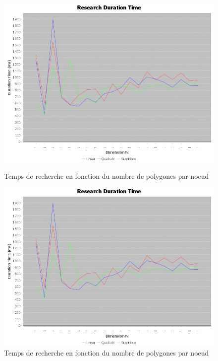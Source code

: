 \documentclass {article}
\begin{document}
\begin{figure}[h]
    \begin{minipage}[t]{0.46\textwidth}
	\centering
	\includegraphics[width=\textwidth]{research_graph_belgium.png}
	\caption{Temps de recherche en fonction du nombre de polygones par noeud}
	\label{fig:belgique_stat_find_lin}
    \end{minipage}
    \begin{minipage}[t]{0.46\textwidth}
	\centering
	\includegraphics[width=\textwidth]{research_graph_belgium.png}
	\caption{Temps de recherche en fonction du nombre de polygones par noeud}
	\label{fig:belgique_stat_find_quad}
    \end{minipage}
\end{figure}
\end{document}
